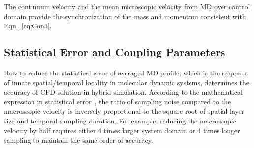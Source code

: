 \documentclass[preprint,12pt]{elsarticle}
\begin{document}
The continuum velocity and the mean microscopic velocity from MD over control domain provide the synchronization of the mass and momentum consistent with Eqn.~\ref{eq:Con3}.


\subsection{Statistical Error and Coupling Parameters}
\label{sec:numerical_noise}


How to reduce the statistical error of averaged MD profile, which is the response of innate spatial/temporal locality in molecular dynamic systems, determines the accuracy of CFD solution in hybrid simulation. According to the mathematical expression in statistical error~\cite{Hadjicon3,Time_Mechanism}, the ratio of sampling noise compared to the macroscopic velocity is inversely proportional to the square root of spatial layer size and temporal sampling duration. For example, reducing the macroscopic velocity by half requires either 4 times larger system domain or 4 times longer sampling to maintain the same order of accuracy.

\end{document}
